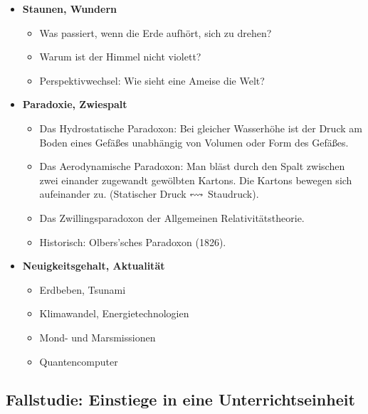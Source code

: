 \begin{itemize}
	
	\item {\bf Staunen, Wundern}
	\begin{beisp2}
		\begin{itemize}
			\item Was passiert, wenn die Erde aufhört, sich zu drehen?
			\item Warum ist der Himmel nicht violett?
			\item Perspektivwechsel: Wie sieht eine Ameise die Welt?
		\end{itemize}
	\end{beisp2}
	\item {\bf Paradoxie, Zwiespalt}
	\begin{beisp2}
		\begin{itemize}
		\item
		Das Hydrostatische Paradoxon: Bei gleicher Wasserh\"{o}he ist der
		Druck am Boden eines Gef\"{a}{\ss}es unabh\"{a}ngig von Volumen oder Form
		des Gef\"{a}{\ss}es.
		\item
		Das Aerodynamische Paradoxon: Man bl\"{a}st durch den Spalt zwischen
		zwei einander zugewandt gew\"{o}lbten Kartons.
		Die Kartons bewegen sich aufeinander zu.
		(Statischer Druck $\leftrightsquigarrow$ Staudruck).
		
		\item
		Das Zwillingsparadoxon der Allgemeinen Relativit\"{a}tstheorie.
		
		\item
		Historisch: Olbers'sches Paradoxon (1826).
		\end{itemize}
	\end{beisp2}
	
	
	
	\item {\bf Neuigkeitsgehalt, Aktualit\"{a}t}
	\begin{beisp2}
		\begin{itemize}
			\item Erdbeben, Tsunami
			\item Klimawandel, Energietechnologien
			\item Mond- und Marsmissionen
			\item Quantencomputer
		\end{itemize}
	\end{beisp2}
\end{itemize}

\subsection{Fallstudie: Einstiege in eine Unterrichtseinheit}

